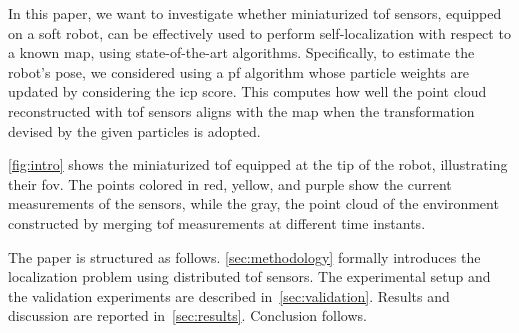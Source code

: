 In this paper, we want to investigate whether miniaturized \gls{tof} sensors, equipped on a soft robot, can be effectively used to perform self-localization with respect to a known map, using state-of-the-art algorithms.
%
Specifically, to estimate the robot's pose, we considered using a \gls{pf} algorithm whose particle weights are updated by considering the \gls{icp} score. This computes how well the point cloud reconstructed with \gls{tof} sensors aligns with the map when the transformation devised by the given particles is adopted.  

\cref{fig:intro} shows the miniaturized \gls{tof} equipped at the tip of the robot, illustrating their \gls{fov}. The points colored in red, yellow, and purple show the current measurements of the sensors, while the gray, the point cloud of the environment constructed by merging \gls{tof} measurements at different time instants.
%

The paper is structured as follows. 
\cref{sec:methodology} formally introduces the localization problem using distributed \gls{tof} sensors. The experimental setup and the validation experiments are described in~\cref{sec:validation}. Results and discussion are reported in~\cref{sec:results}. Conclusion follows.


